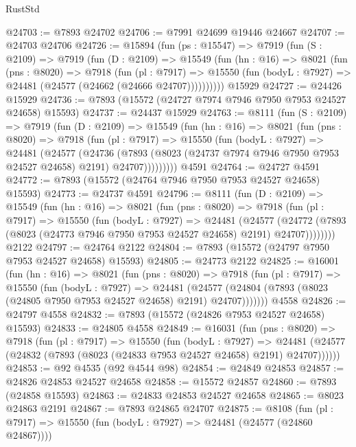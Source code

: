 \begin{lexlean}{RustStd}
\begin{coremodule}
@24703 := @7893 @24702
@24706 := @7991 @24699 @19446 @24667
@24707 := @24703 @24706
@24726 := @15894
    (fun (ps : @15547) =>
    @7919
      (fun (S : @2109) =>
      @7919
        (fun (D : @2109) =>
        @15549
          (fun (hn : @16) =>
          @8021
            (fun (pns : @8020) =>
            @7918
              (fun (pl : @7917) =>
              @15550 (fun (bodyL : @7927) => @24481 (@24577 (@24662 (@24666 @24707))))))))))
    @15929
@24727 := @24426 @15929
@24736 := @7893 (@15572 (@24727 @7974 @7946 @7950 @7953 @24527 @24658) @15593)
@24737 := @24437 @15929
@24763 := @8111
    (fun (S : @2109) =>
    @7919
      (fun (D : @2109) =>
      @15549
        (fun (hn : @16) =>
        @8021
          (fun (pns : @8020) =>
          @7918
            (fun (pl : @7917) =>
            @15550
              (fun (bodyL : @7927) =>
              @24481
                (@24577
                  (@24736
                    (@7893
                      (@8023 (@24737 @7974 @7946 @7950 @7953 @24527 @24658) @2191)
                      @24707)))))))))
    @4591
@24764 := @24727 @4591
@24772 := @7893 (@15572 (@24764 @7946 @7950 @7953 @24527 @24658) @15593)
@24773 := @24737 @4591
@24796 := @8111
    (fun (D : @2109) =>
    @15549
      (fun (hn : @16) =>
      @8021
        (fun (pns : @8020) =>
        @7918
          (fun (pl : @7917) =>
          @15550
            (fun (bodyL : @7927) =>
            @24481
              (@24577
                (@24772 (@7893 (@8023 (@24773 @7946 @7950 @7953 @24527 @24658) @2191) @24707))))))))
    @2122
@24797 := @24764 @2122
@24804 := @7893 (@15572 (@24797 @7950 @7953 @24527 @24658) @15593)
@24805 := @24773 @2122
@24825 := @16001
    (fun (hn : @16) =>
    @8021
      (fun (pns : @8020) =>
      @7918
        (fun (pl : @7917) =>
        @15550
          (fun (bodyL : @7927) =>
          @24481
            (@24577 (@24804 (@7893 (@8023 (@24805 @7950 @7953 @24527 @24658) @2191) @24707)))))))
    @4558
@24826 := @24797 @4558
@24832 := @7893 (@15572 (@24826 @7953 @24527 @24658) @15593)
@24833 := @24805 @4558
@24849 := @16031
    (fun (pns : @8020) =>
    @7918
      (fun (pl : @7917) =>
      @15550
        (fun (bodyL : @7927) =>
        @24481 (@24577 (@24832 (@7893 (@8023 (@24833 @7953 @24527 @24658) @2191) @24707))))))
@24853 := @92 @4535 (@92 @4544 @98)
@24854 := @24849 @24853
@24857 := @24826 @24853 @24527 @24658
@24858 := @15572 @24857
@24860 := @7893 (@24858 @15593)
@24863 := @24833 @24853 @24527 @24658
@24865 := @8023 @24863 @2191
@24867 := @7893 @24865 @24707
@24875 := @8108
    (fun (pl : @7917) => @15550 (fun (bodyL : @7927) => @24481 (@24577 (@24860 @24867))))

\end{coremodule}
\end{lexlean}
